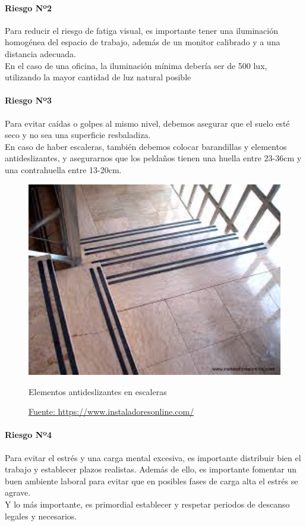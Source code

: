 \paragraph*{Riesgo Nº2}
Para reducir el riesgo de fatiga visual, es importante tener una iluminación
homogénea del espacio de trabajo, además de un monitor calibrado y a una distancia
adecuada.\\
En el caso de una oficina, la iluminación mínima debería ser de 500 lux, utilizando la mayor cantidad de luz natural posible
\paragraph*{Riesgo Nº3}
Para evitar caídas o golpes al mismo nivel, debemos asegurar que el suelo esté seco y
no sea una superficie resbaladiza. \\
En caso de haber escaleras, también debemos colocar barandillas y elementos antideslizantes, y asegurarnos que los peldaños tienen una
huella entre 23-36cm y una contrahuella entre 13-20cm.
\begin{figure}[H]
    \centering
    \includegraphics[width=1.0\textwidth]{Fol/elemAntides.jpg}
    \caption{Elementos antideslizantes en escaleras}
    \caption*{\href{http://www.instaladoresonline.com/cintas_antideslizantes_safety_walk.html}{Fuente: https://www.instaladoresonline.com/}}
\end{figure}
\paragraph*{Riesgo Nº4}
Para evitar el estrés y una carga mental excesiva, es importante distribuir bien el trabajo 
y establecer plazos realistas. Además de ello, es importante fomentar un buen ambiente laboral para
evitar que en posibles fases de carga alta el estrés se agrave. \\ 
Y lo más importante, es primordial establecer y respetar periodos de descanso legales y necesarios. 
